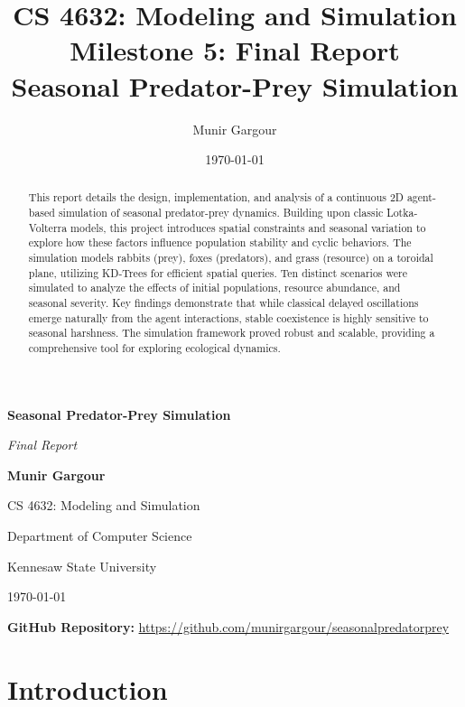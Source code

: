 \documentclass[12pt]{article}
\title{
    \textbf{CS 4632: Modeling and Simulation}\\
    \large Milestone 5: Final Report\\[0.5em]
    \normalsize Seasonal Predator-Prey Simulation
}
\author{Munir Gargour}
\date{\today}
\begin{document}
\begin{titlepage}
    \centering
    \vspace*{2cm}
    
    {\Huge\bfseries Seasonal Predator-Prey Simulation\par}
    \vspace{1.5cm}
    {\Large\itshape Final Report\par}
    \vspace{2cm}
    {\Large\bfseries Munir Gargour\par}
    \vfill
    {\large CS 4632: Modeling and Simulation\par}
    {\large Department of Computer Science\par}
    {\large Kennesaw State University\par}
    \vspace{1cm}
    {\large \today\par}
    \vspace{1.5cm}
    {\large \textbf{GitHub Repository:} \url{https://github.com/munirgargour/seasonalpredatorprey}\par}
\end{titlepage}

\begin{abstract}
This report details the design, implementation, and analysis of a continuous 2D agent-based simulation of seasonal predator-prey dynamics. Building upon classic Lotka-Volterra models, this project introduces spatial constraints and seasonal variation to explore how these factors influence population stability and cyclic behaviors. The simulation models rabbits (prey), foxes (predators), and grass (resource) on a toroidal plane, utilizing KD-Trees for efficient spatial queries. Ten distinct scenarios were simulated to analyze the effects of initial populations, resource abundance, and seasonal severity. Key findings demonstrate that while classical delayed oscillations emerge naturally from the agent interactions, stable coexistence is highly sensitive to seasonal harshness. The simulation framework proved robust and scalable, providing a comprehensive tool for exploring ecological dynamics.
\end{abstract}

\newpage
\tableofcontents
\newpage

\section{Introduction}
\end{document}
